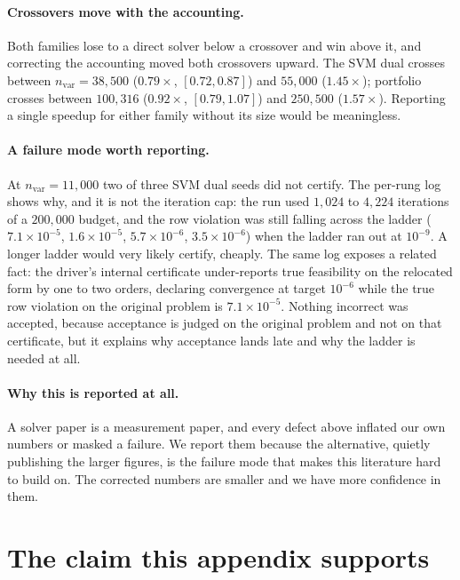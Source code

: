 \documentclass[11pt]{article}
\begin{document}
\paragraph{Crossovers move with the accounting.}
Both families lose to a direct solver below a crossover and win above it, and
correcting the accounting moved both crossovers upward. The SVM dual crosses
between $n_{\mathrm{var}} = 38{,}500$ ($0.79\times$, $[0.72, 0.87]$) and
$55{,}000$ ($1.45\times$); portfolio crosses between $100{,}316$
($0.92\times$, $[0.79, 1.07]$) and $250{,}500$ ($1.57\times$). Reporting a
single speedup for either family without its size would be meaningless.

\paragraph{A failure mode worth reporting.}
At $n_{\mathrm{var}} = 11{,}000$ two of three SVM dual seeds did not certify.
The per-rung log shows why, and it is not the iteration cap: the run used
$1{,}024$ to $4{,}224$ iterations of a $200{,}000$ budget, and the row
violation was still falling across the ladder
($7.1\times10^{-5}$, $1.6\times10^{-5}$, $5.7\times10^{-6}$,
$3.5\times10^{-6}$) when the ladder ran out at $10^{-9}$. A longer ladder
would very likely certify, cheaply. The same log exposes a related fact: the
driver's internal certificate under-reports true feasibility on the relocated
form by one to two orders, declaring convergence at target $10^{-6}$ while
the true row violation on the original problem is $7.1\times10^{-5}$. Nothing
incorrect was accepted, because acceptance is judged on the original problem
and not on that certificate, but it explains why acceptance lands late and
why the ladder is needed at all.

\paragraph{Why this is reported at all.}
A solver paper is a measurement paper, and every defect above inflated our
own numbers or masked a failure. We report them because the alternative,
quietly publishing the larger figures, is the failure mode that makes this
literature hard to build on. The corrected numbers are smaller and we have
more confidence in them.

\section{The claim this appendix supports}
\label{app:claim}
\end{document}
